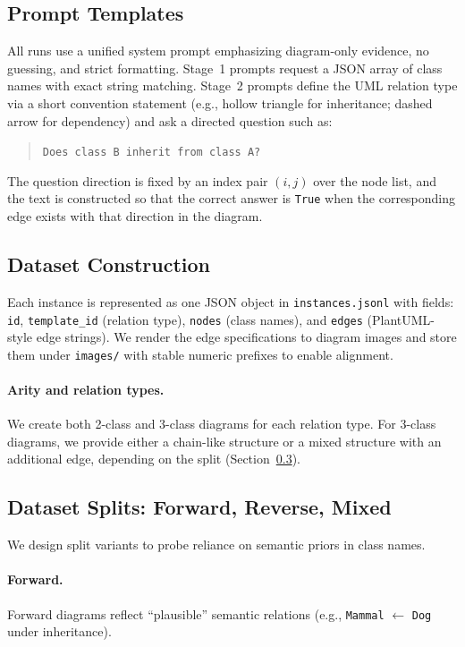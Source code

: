 \documentclass[11pt]{article}
\begin{document}
\subsection{Prompt Templates}
\label{sec:prompts}
All runs use a unified system prompt emphasizing diagram-only evidence, no guessing, and strict formatting.
Stage~1 prompts request a JSON array of class names with exact string matching.
Stage~2 prompts define the UML relation type via a short convention statement (e.g., hollow triangle for inheritance; dashed arrow for dependency) and ask a directed question such as:
\begin{quote}\small
\texttt{Does class B inherit from class A?}
\end{quote}
The question direction is fixed by an index pair $(i,j)$ over the node list, and the text is constructed so that the correct answer is \texttt{True} when the corresponding edge exists with that direction in the diagram.

\subsection{Dataset Construction}
\label{sec:data}
Each instance is represented as one JSON object in \texttt{instances.jsonl} with fields:
\texttt{id}, \texttt{template\_id} (relation type), \texttt{nodes} (class names), and \texttt{edges} (PlantUML-style edge strings).
We render the edge specifications to diagram images and store them under \texttt{images/} with stable numeric prefixes to enable alignment.

\paragraph{Arity and relation types.}
We create both 2-class and 3-class diagrams for each relation type.
For 3-class diagrams, we provide either a chain-like structure or a mixed structure with an additional edge, depending on the split (Section~\ref{sec:splits}).

\subsection{Dataset Splits: Forward, Reverse, Mixed}
\label{sec:splits}
We design split variants to probe reliance on semantic priors in class names.

\paragraph{Forward.}
Forward diagrams reflect ``plausible'' semantic relations (e.g., \texttt{Mammal} $\leftarrow$ \texttt{Dog} under inheritance).
\end{document}
